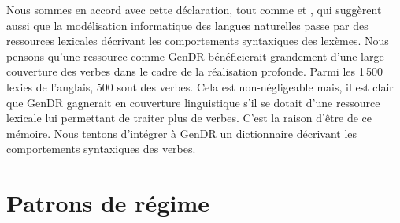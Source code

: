 Nous sommes en accord avec cette déclaration, tout comme \cite{Korhonenlargesubcategorizationlexicon2006} et \cite{MESSIANT08.142}, qui suggèrent aussi que la modélisation informatique des langues naturelles passe par des ressources lexicales décrivant les comportements syntaxiques des lexèmes. Nous pensons qu'une ressource comme GenDR bénéficierait grandement d'une large couverture des verbes dans le cadre de la réalisation profonde. Parmi les 1\,500 lexies de l'anglais, 500 sont des verbes. Cela est non-négligeable mais, il est clair que GenDR gagnerait en couverture linguistique s'il se dotait d'une ressource lexicale lui permettant de traiter plus de verbes. C'est la raison d'être de ce mémoire. Nous tentons d'intégrer à GenDR un dictionnaire décrivant les comportements syntaxiques des verbes.

\section{Patrons de régime}\label{sectiongp}

